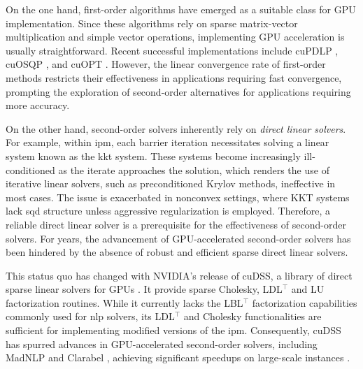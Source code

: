 \documentclass{article}
\begin{document}
On the one hand, first-order algorithms have emerged as a suitable class for GPU implementation. Since these algorithms rely on sparse matrix-vector multiplication and simple vector operations, implementing GPU acceleration is usually straightforward. Recent successful implementations include cuPDLP \cite{luCuPDLPCStrengthenedImplementation2024,luCuPDLPFurtherEnhanced2025}, cuOSQP \cite{schubigerGPUAccelerationADMM2020}, and cuOPT \cite{NVIDIACuopt2025}. However, the linear convergence rate of first-order methods restricts their effectiveness in applications requiring fast convergence, prompting the exploration of second-order alternatives for applications requiring more accuracy.

On the other hand, second-order solvers inherently rely on \emph{direct linear solvers}. For example, within \gls*{ipm}, each barrier iteration necessitates solving a linear system known as the \gls*{kkt} system. These systems become increasingly ill-conditioned as the iterate approaches the solution, which renders the use of iterative linear solvers, such as preconditioned Krylov methods, ineffective in most cases.
The issue is exacerbated in nonconvex settings, where KKT systems lack \gls*{sqd} structure unless aggressive regularization is employed.
Therefore, a reliable direct linear solver is a prerequisite for the effectiveness of second-order solvers. For years, the advancement of GPU-accelerated second-order solvers has been hindered by the absence of robust and efficient sparse direct linear solvers.

This status quo has changed with NVIDIA's release of cuDSS, a library of direct sparse linear solvers for GPUs \cite{nvidiaNVIDIACuDSSPreview}.
It provide sparse Cholesky, LDL$^\top$ and LU factorization routines.
While it currently lacks the LBL$^\top$ factorization capabilities commonly used for \gls*{nlp} solvers, its LDL$^\top$ and Cholesky functionalities are sufficient for implementing modified versions of the \gls*{ipm}.
Consequently, cuDSS has spurred advances in GPU-accelerated second-order solvers, including MadNLP \cite{shinAcceleratingOptimalPower2024} and Clarabel \cite{goulartClarabelInteriorpointSolver2024}, achieving significant speedups on large-scale instances \cite{shinNVIDIACuDSSLibrary2024,shinAcceleratingOptimalPower2024,pacaudCondensedspaceMethodsNonlinear2024,shinScalableMultiPeriodAC2024,pacaudGPUacceleratedDynamicNonlinear2024}.
\end{document}
